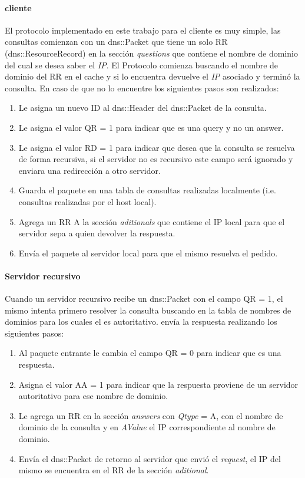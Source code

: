 \documentclass[10pt,a4paper]{article}
\begin{document}
\paragraph{cliente}
El protocolo implementado en este trabajo para el cliente es muy simple, las consultas comienzan con un dns::Packet que tiene un solo RR (dns::ResourceRecord) en la sección \textit{questions} que contiene el nombre de dominio del cual se desea saber el \textit{IP}. El Protocolo comienza buscando el nombre de dominio del RR en el cache y si lo encuentra devuelve el \textit{IP} asociado y terminó la consulta. En caso de que no lo encuentre los siguientes pasos son realizados:

\begin{enumerate}
\item Le asigna un nuevo ID al dns::Header del dns::Packet de la consulta.
\item Le asigna el valor QR = 1 para indicar que es una query y no un answer.
\item Le asigna el valor RD = 1 para indicar que desea que la consulta se resuelva de forma recursiva, si el servidor no es recursivo este campo será ignorado y enviara una redirección a otro servidor.
\item Guarda el paquete en una tabla de consultas realizadas localmente (i.e. consultas realizadas por el host local).
\item Agrega un RR A la sección \textit{aditionals} que contiene el IP local para que el servidor sepa a quien devolver la respuesta.
\item Envía el paquete al servidor local para que el mismo resuelva el pedido.
\end{enumerate}

\paragraph{Servidor recursivo}
Cuando un servidor recursivo recibe un dns::Packet con el campo QR = 1, el mismo intenta primero resolver la consulta buscando en la tabla de nombres de dominios para los cuales el es autoritativo. envía la respuesta realizando los siguientes pasos:

\begin{enumerate}
\item Al paquete entrante le cambia el campo QR = 0 para indicar que es una respuesta.
\item Asigna el valor AA = 1 para indicar que la respuesta proviene de un servidor autoritativo para ese nombre de dominio.
\item Le agrega un RR en la sección \textit{answers} con \textit{Qtype} = A, con el nombre de dominio de la consulta y en \textit{AValue} el IP correspondiente al nombre de dominio.
\item Envía el dns::Packet de retorno al servidor que envió el \textit{request}, el IP del mismo se encuentra en el RR de la sección \textit{aditional}.
\end{enumerate}
\end{document}
